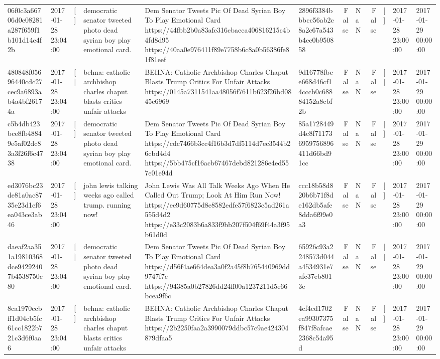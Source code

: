 \begin{tabular}{llllllrlrlll}
06f0c3a66706d0e08281a287f659f1b101d14e4f2b & 2017-01-28 23:04:00 & [] & democratic senator tweeted photo dead syrian boy play emotional card. & Dem Senator Tweets Pic Of Dead Syrian Boy To Play Emotional Card https://44fbb2b0a83afe316cbaeca406816215c4b4fd8d95 https://40aa0e976411f89e7758b6c8a0b56386fe81f81eef & 2896f3384bbbcc56ab2c8a2c67a543b4ec0b950858 & False & NaN & False & [] & 2017-01-28 23:00:00 & 2017-01-29 00:00:00 \\
480848f05696440cdc27cec9a6893ab4a4bf26174a & 2017-01-28 23:04:00 & [] & behna: catholic archbishop charles chaput blasts critics unfair attacks & BEHNA: Catholic Archbishop Charles Chaput Blasts Trump Critics For Unfair Attacks https://0145a7311541aa48056f7611b623f26bd0845c6969 & 9d16778fbce668d46cf14cccb0c68884152a8cbf2b & False & NaN & False & [] & 2017-01-28 23:00:00 & 2017-01-29 00:00:00 \\
c5b4db423bce8fb48849e5af02dc83a3f26f6c4738 & 2017-01-28 23:04:00 & [] & democratic senator tweeted photo dead syrian boy play emotional card. & Dem Senator Tweets Pic Of Dead Syrian Boy To Play Emotional Card https://cdc7466b3cc4f16b3d7df5114d7ec3544b26cbd4d4 https://5bb475cf16acb67467debd821286e4ed557e01e94d & 85a1728449d4c8f711736959756896411d66bd91cc & False & NaN & False & [] & 2017-01-28 23:00:00 & 2017-01-29 00:00:00 \\
ed3076bc23de81a0ac8735e23d1ef6ea043ce3ab46 & 2017-01-28 23:04:00 & [] & john lewis talking weeks ago called trump. running now! & John Lewis Was All Talk Weeks Ago When He Called Out Trump; Look At Him Run Now! https://ee9d60775d8e8582edfe57f6823c5ad261a555d4d2 https://e33c2083b6a833f9bb207f504f69f44a3f95b61d0d & ccc18b58d820b6b71f8de162db5afe8dda6f99e0a3 & False & NaN & False & [] & 2017-01-28 23:00:00 & 2017-01-29 00:00:00 \\
daeaf2aa351a19810368dce94292407b4538750c80 & 2017-01-28 23:04:00 & [] & democratic senator tweeted photo dead syrian boy play emotional card. & Dem Senator Tweets Pic Of Dead Syrian Boy To Play Emotional Card https://d56f4ae664dea3a0f2a45f8b765440969dd9747f7c https://94385a0b27826dd24ff00a1237211d5e66bcea9f6c & 65926c93a2248573d044a4534931e7afc37eb8013e & False & NaN & False & [] & 2017-01-28 23:00:00 & 2017-01-29 00:00:00 \\
8ca1970ccbff1d04cb5fc61cc1822b721c3d6f0aa6 & 2017-01-28 23:04:00 & [] & behna: catholic archbishop charles chaput blasts critics unfair attacks & BEHNA: Catholic Archbishop Charles Chaput Blasts Trump Critics For Unfair Attacks https://2b2250faa2a3990079ddbc57c9ae424304879dfaa5 & 4cf4cd1702ea99307375f847f8afcae2368c54a95d & False & NaN & False & [] & 2017-01-28 23:00:00 & 2017-01-29 00:00:00 \\

\end{tabular}
